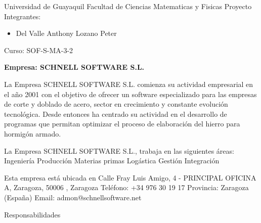 \begin{center}
Universidad de Guayaquil
Facultad de Ciencias Matematicas y Fisicas
Proyecto
Integrantes:
\begin{itemize}
	\item Del Valle Anthony
Lozano Peter
\end{itemize}
Curso: SOF-S-MA-3-2
\end{center}

\textbf{Empresa: SCHNELL SOFTWARE S.L.}

La Empresa SCHNELL SOFTWARE S.L. comienza su actividad empresarial en el año 2001 con el objetivo de ofrecer un software especializado para las empresas de corte y doblado de acero, sector en crecimiento y constante evolución tecnológica. Desde entonces ha centrado su actividad en el desarrollo de programas que permitan optimizar el proceso de elaboración del hierro para hormigón armado.

La Empresa SCHNELL SOFTWARE S.L., trabaja en las siguientes áreas:
Ingeniería
Producción
Materias primas
Logástica
Gestión
Integración

Esta empresa está ubicada en Calle Fray Luis Amigo, 4 - PRINCIPAL OFICINA A, Zaragoza, 50006 , Zaragoza
Teléfono: +34 976 30 19 17
Provincia: Zaragoza (España)
Email: admon@schnellsoftware.net

Responsabilidades
